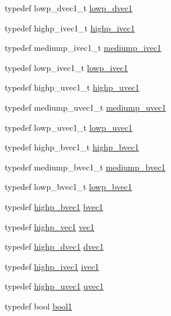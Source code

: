 \begin{DoxyCompactItemize}
\item 
typedef lowp\+\_\+dvec1\+\_\+t \hyperlink{namespaceglm_a1c35f3740df7d57374db693074272cc6}{lowp\+\_\+dvec1}
\item 
typedef highp\+\_\+ivec1\+\_\+t \hyperlink{namespaceglm_addb6724b01f125e2730aeaad6130b06f}{highp\+\_\+ivec1}
\item 
typedef mediump\+\_\+ivec1\+\_\+t \hyperlink{namespaceglm_a7efcceaaa791c2380d1b17bd7baa45ee}{mediump\+\_\+ivec1}
\item 
typedef lowp\+\_\+ivec1\+\_\+t \hyperlink{namespaceglm_a5d781b915bec50a9d5b5383835035533}{lowp\+\_\+ivec1}
\item 
typedef highp\+\_\+uvec1\+\_\+t \hyperlink{namespaceglm_a2a480125ab05aa522d883651ea1101f8}{highp\+\_\+uvec1}
\item 
typedef mediump\+\_\+uvec1\+\_\+t \hyperlink{namespaceglm_a1fa5a5fb993ee72b4dc8d2a9caf85b26}{mediump\+\_\+uvec1}
\item 
typedef lowp\+\_\+uvec1\+\_\+t \hyperlink{namespaceglm_ad50d8a6d477675ffc627f0949f1d5615}{lowp\+\_\+uvec1}
\item 
typedef highp\+\_\+bvec1\+\_\+t \hyperlink{namespaceglm_ad24a2ac97dbfbece48f504224bb20b59}{highp\+\_\+bvec1}
\item 
typedef mediump\+\_\+bvec1\+\_\+t \hyperlink{namespaceglm_a6c2cab6a7010331621a5ce656dd5f58d}{mediump\+\_\+bvec1}
\item 
typedef lowp\+\_\+bvec1\+\_\+t \hyperlink{namespaceglm_af22d6a46a35bcda63801fe78c033f35f}{lowp\+\_\+bvec1}
\item 
typedef \hyperlink{namespaceglm_ad24a2ac97dbfbece48f504224bb20b59}{highp\+\_\+bvec1} \hyperlink{namespaceglm_a30260c045e085bb8d19eddca772cac61}{bvec1}
\item 
typedef \hyperlink{namespaceglm_ab3f08c031846e7a95b49e81c48d920d3}{highp\+\_\+vec1} \hyperlink{namespaceglm_a16030dae9029ed1eab1553a2183bbb79}{vec1}
\item 
typedef \hyperlink{namespaceglm_a5c7219ea9af2efb28506cabc8633a4d7}{highp\+\_\+dvec1} \hyperlink{namespaceglm_a8d5252eec287cf34cc18a219a118f9f2}{dvec1}
\item 
typedef \hyperlink{namespaceglm_addb6724b01f125e2730aeaad6130b06f}{highp\+\_\+ivec1} \hyperlink{namespaceglm_a946031cea0c22745848ebd873e6facb0}{ivec1}
\item 
typedef \hyperlink{namespaceglm_a2a480125ab05aa522d883651ea1101f8}{highp\+\_\+uvec1} \hyperlink{namespaceglm_a4e12bc23a3d060164eef452f81d92a03}{uvec1}
\item 
typedef bool \hyperlink{group__gtx__compatibility_gab65f19f5170f95a2f06d6aa6482c9405}{bool1}

\end{DoxyCompactItemize}
